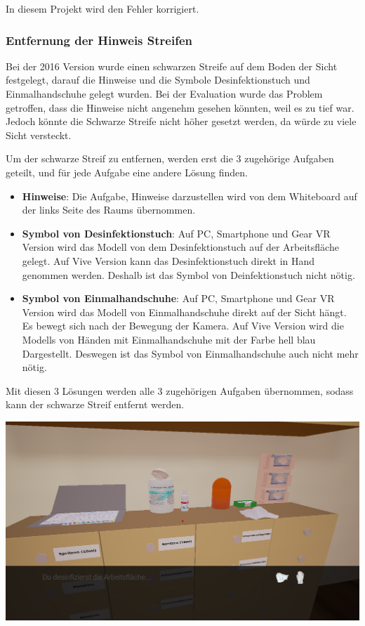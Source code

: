 In diesem Projekt wird den Fehler korrigiert.

   \subsubsection{Entfernung der Hinweis Streifen}
   Bei der 2016 Version wurde einen schwarzen Streife auf dem Boden der Sicht festgelegt, darauf die Hinweise und die Symbole Desinfektionstuch und Einmalhandschuhe gelegt wurden. Bei der Evaluation wurde das Problem getroffen, dass die Hinweise nicht angenehm gesehen könnten, weil es zu tief war. Jedoch könnte die Schwarze Streife nicht höher gesetzt werden, da würde zu viele Sicht versteckt.
   
   Um der schwarze Streif zu entfernen, werden erst die 3 zugehörige Aufgaben geteilt, und für jede Aufgabe eine andere Lösung finden.
   
   \begin{itemize}
       \item \textbf{Hinweise}: Die Aufgabe, Hinweise darzustellen wird von dem Whiteboard auf der links Seite des Raums übernommen.
       \item \textbf{Symbol von Desinfektionstuch}: Auf PC, Smartphone und Gear VR Version wird das Modell von dem Desinfektionstuch auf der Arbeitsfläche gelegt. Auf Vive Version kann das Desinfektionstuch direkt in Hand genommen werden. Deshalb ist das Symbol von Deinfektionstuch nicht nötig.
       \item \textbf{Symbol von Einmalhandschuhe}: Auf PC, Smartphone und Gear VR Version wird das Modell von Einmalhandschuhe direkt auf der Sicht hängt. Es bewegt sich nach der Bewegung der Kamera. Auf Vive Version wird die Modells von Händen mit Einmalhandschuhe mit der Farbe hell blau Dargestellt. Deswegen ist das Symbol von Einmalhandschuhe auch nicht mehr nötig. 
   \end{itemize}
   
   Mit diesen 3 Lösungen werden alle 3 zugehörigen Aufgaben übernommen, sodass kann der schwarze Streif entfernt werden.
   
   \includegraphics[width=\textwidth]{images/Schritt_4_2.png}

